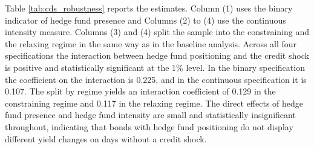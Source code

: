 \documentclass[english, 11pt, oneside]{article}
\begin{document}
Table \ref{tab:cds_robustness} reports the estimates. Column (1) uses the binary indicator of hedge fund presence and Columns (2) to (4) use the continuous intensity measure. Columns (3) and (4) split the sample into the constraining and the relaxing regime in the same way as in the baseline analysis. Across all four specifications the interaction between hedge fund positioning and the credit shock is positive and statistically significant at the 1\% level. In the binary specification the coefficient on the interaction is 0.225, and in the continuous specification it is 0.107. The split by regime yields an interaction coefficient of 0.129 in the constraining regime and 0.117 in the relaxing regime. The direct effects of hedge fund presence and hedge fund intensity are small and statistically insignificant throughout, indicating that bonds with hedge fund positioning do not display different yield changes on days without a credit shock.
\end{document}
